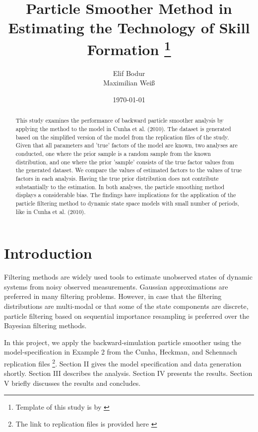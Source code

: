 \documentclass[11pt, a4paper, leqno]{article}
\begin{document}
\title{Particle Smoother Method in Estimating the Technology of Skill Formation  \thanks{Template of this study is by \citep{GaudeckerEconProjectTemplates}}}

\author{Elif Bodur \\ Maximilian Weiß}

\date{
\today
}

\maketitle


\begin{abstract}
	This study examines the performance of backward particle smoother analysis by applying the method to the model in Cunha et al. (2010). The \nocite{cunha2010} dataset is generated based on the simplified version of the model from the replication files of the study. Given that all parameters and 'true'  factors of the model are known, two analyses are conducted, one where the prior sample is a random sample from the known distribution, and one where the prior 'sample' consists of the true factor values from the generated dataset. We compare the values of estimated factors to the values of true factors in each analysis. Having the true prior distribution does not contribute substantially to the estimation. In both analyses, the particle smoothing method displays a considerable bias. The findings have implications for the application of the particle filtering method to dynamic state space models with small number of periods, like in Cunha et al. (2010).
\end{abstract}
\clearpage

\section{Introduction} %
\label{sec:introduction}

Filtering methods are widely used tools to estimate unobserved states of dynamic systems from noisy observed measurements. Gaussian approximations are preferred in many filtering problems. However, in case that the filtering distributions are multi-modal or that some of the state components are discrete, particle filtering based on sequential importance resampling is preferred over the Bayesian filtering methods\nocite{sarkka2013}. \par

In this project, we apply the backward-simulation particle smoother using the model-specification in Example 2 from the Cunha, Heckman, and Schennach replication files \footnote{The link to replication files is provided here \citep{chs_rep}}. Section II gives the model specification and data generation shortly. Section III describes the analysis. Section IV presents the results. Section V briefly discusses the results and concludes.
\end{document}
